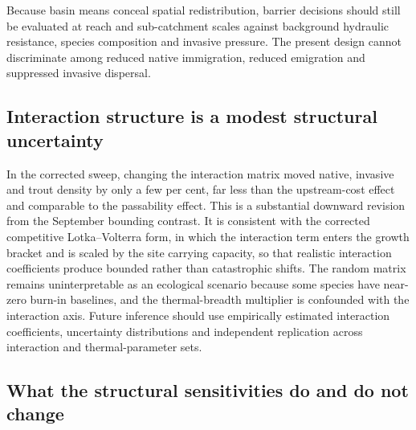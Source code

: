 \documentclass[11pt,a4paper]{article}
\begin{document}
Because basin means conceal spatial redistribution, barrier decisions should still be evaluated at reach and sub-catchment scales against background hydraulic resistance, species composition and invasive pressure. The present design cannot discriminate among reduced native immigration, reduced emigration and suppressed invasive dispersal.

\subsection{Interaction structure is a modest structural uncertainty}

In the corrected sweep, changing the interaction matrix moved native, invasive and trout density by only a few per cent, far less than the upstream-cost effect and comparable to the passability effect. This is a substantial downward revision from the September bounding contrast. It is consistent with the corrected competitive Lotka--Volterra form, in which the interaction term enters the growth bracket and is scaled by the site carrying capacity, so that realistic interaction coefficients produce bounded rather than catastrophic shifts. The random matrix remains uninterpretable as an ecological scenario because some species have near-zero burn-in baselines, and the thermal-breadth multiplier is confounded with the interaction axis. Future inference should use empirically estimated interaction coefficients, uncertainty distributions and independent replication across interaction and thermal-parameter sets.

\subsection{What the structural sensitivities do and do not change}
\end{document}
